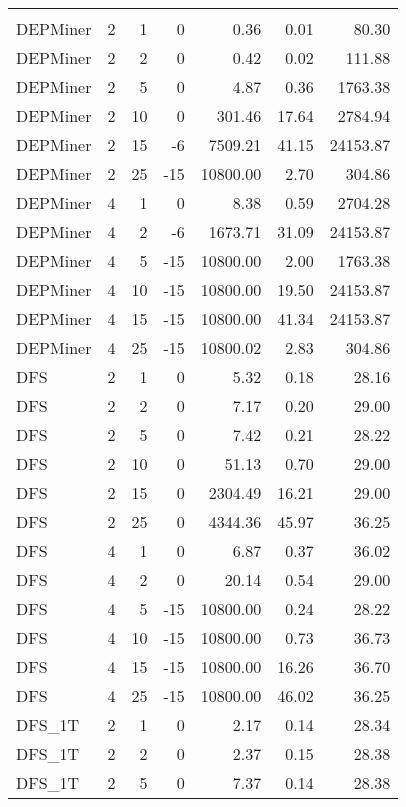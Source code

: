 \begin{center}
\begin{longtable}{lrrrrrr}
\hline\endlastfoot
\\
DEPMiner     & 2 & 1 &   0 & 0.36 & 0.01 & 80.30 \\ 
  DEPMiner     & 2 & 2 &   0 & 0.42 & 0.02 & 111.88 \\ 
  DEPMiner     & 2 & 5 &   0 & 4.87 & 0.36 & 1763.38 \\ 
  DEPMiner     & 2 & 10 &   0 & 301.46 & 17.64 & 2784.94 \\ 
  DEPMiner     & 2 & 15 &  -6 & 7509.21 & 41.15 & 24153.87 \\ 
  DEPMiner     & 2 & 25 & -15 & 10800.00 & 2.70 & 304.86 \\ 
  DEPMiner     & 4 & 1 &   0 & 8.38 & 0.59 & 2704.28 \\ 
  DEPMiner     & 4 & 2 &  -6 & 1673.71 & 31.09 & 24153.87 \\ 
  DEPMiner     & 4 & 5 & -15 & 10800.00 & 2.00 & 1763.38 \\ 
  DEPMiner     & 4 & 10 & -15 & 10800.00 & 19.50 & 24153.87 \\ 
  DEPMiner     & 4 & 15 & -15 & 10800.00 & 41.34 & 24153.87 \\ 
  DEPMiner     & 4 & 25 & -15 & 10800.02 & 2.83 & 304.86 \\ 
  DFS     & 2 & 1 &   0 & 5.32 & 0.18 & 28.16 \\ 
  DFS     & 2 & 2 &   0 & 7.17 & 0.20 & 29.00 \\ 
  DFS     & 2 & 5 &   0 & 7.42 & 0.21 & 28.22 \\ 
  DFS     & 2 & 10 &   0 & 51.13 & 0.70 & 29.00 \\ 
  DFS     & 2 & 15 &   0 & 2304.49 & 16.21 & 29.00 \\ 
  DFS     & 2 & 25 &   0 & 4344.36 & 45.97 & 36.25 \\ 
  DFS     & 4 & 1 &   0 & 6.87 & 0.37 & 36.02 \\ 
  DFS     & 4 & 2 &   0 & 20.14 & 0.54 & 29.00 \\ 
  DFS     & 4 & 5 & -15 & 10800.00 & 0.24 & 28.22 \\ 
  DFS     & 4 & 10 & -15 & 10800.00 & 0.73 & 36.73 \\ 
  DFS     & 4 & 15 & -15 & 10800.00 & 16.26 & 36.70 \\ 
  DFS     & 4 & 25 & -15 & 10800.00 & 46.02 & 36.25 \\ 
  DFS\_1T     & 2 & 1 &   0 & 2.17 & 0.14 & 28.34 \\ 
  DFS\_1T     & 2 & 2 &   0 & 2.37 & 0.15 & 28.38 \\ 
  DFS\_1T     & 2 & 5 &   0 & 7.37 & 0.14 & 28.38 \\ 

\end{longtable}
\end{center}
